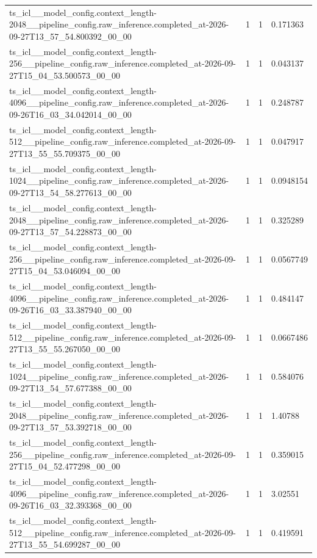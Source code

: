 \begin{tabular}{llll}
ts\_icl\_\_model\_config.context\_length-2048\_\_pipeline\_config.raw\_inference.completed\_at-2026-09-27T13\_57\_54.800392\_00\_00 & 1 & 1 & 0.171363 \\
ts\_icl\_\_model\_config.context\_length-256\_\_pipeline\_config.raw\_inference.completed\_at-2026-09-27T15\_04\_53.500573\_00\_00 & 1 & 1 & 0.043137 \\
ts\_icl\_\_model\_config.context\_length-4096\_\_pipeline\_config.raw\_inference.completed\_at-2026-09-26T16\_03\_34.042014\_00\_00 & 1 & 1 & 0.248787 \\
ts\_icl\_\_model\_config.context\_length-512\_\_pipeline\_config.raw\_inference.completed\_at-2026-09-27T13\_55\_55.709375\_00\_00 & 1 & 1 & 0.047917 \\
ts\_icl\_\_model\_config.context\_length-1024\_\_pipeline\_config.raw\_inference.completed\_at-2026-09-27T13\_54\_58.277613\_00\_00 & 1 & 1 & 0.0948154 \\
ts\_icl\_\_model\_config.context\_length-2048\_\_pipeline\_config.raw\_inference.completed\_at-2026-09-27T13\_57\_54.228873\_00\_00 & 1 & 1 & 0.325289 \\
ts\_icl\_\_model\_config.context\_length-256\_\_pipeline\_config.raw\_inference.completed\_at-2026-09-27T15\_04\_53.046094\_00\_00 & 1 & 1 & 0.0567749 \\
ts\_icl\_\_model\_config.context\_length-4096\_\_pipeline\_config.raw\_inference.completed\_at-2026-09-26T16\_03\_33.387940\_00\_00 & 1 & 1 & 0.484147 \\
ts\_icl\_\_model\_config.context\_length-512\_\_pipeline\_config.raw\_inference.completed\_at-2026-09-27T13\_55\_55.267050\_00\_00 & 1 & 1 & 0.0667486 \\
ts\_icl\_\_model\_config.context\_length-1024\_\_pipeline\_config.raw\_inference.completed\_at-2026-09-27T13\_54\_57.677388\_00\_00 & 1 & 1 & 0.584076 \\
ts\_icl\_\_model\_config.context\_length-2048\_\_pipeline\_config.raw\_inference.completed\_at-2026-09-27T13\_57\_53.392718\_00\_00 & 1 & 1 & 1.40788 \\
ts\_icl\_\_model\_config.context\_length-256\_\_pipeline\_config.raw\_inference.completed\_at-2026-09-27T15\_04\_52.477298\_00\_00 & 1 & 1 & 0.359015 \\
ts\_icl\_\_model\_config.context\_length-4096\_\_pipeline\_config.raw\_inference.completed\_at-2026-09-26T16\_03\_32.393368\_00\_00 & 1 & 1 & 3.02551 \\
ts\_icl\_\_model\_config.context\_length-512\_\_pipeline\_config.raw\_inference.completed\_at-2026-09-27T13\_55\_54.699287\_00\_00 & 1 & 1 & 0.419591 \\

\end{tabular}

